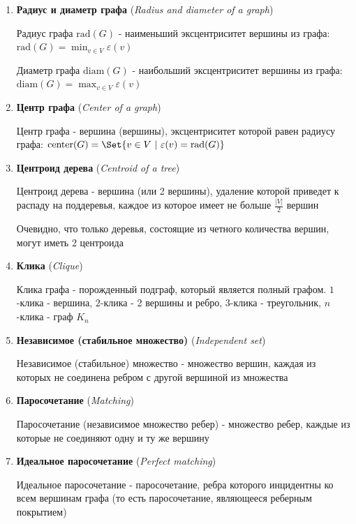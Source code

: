 \documentclass[12pt]{article}
\begin{document}
\begin{enumerate}
        \item \textbf{Радиус и диаметр графа} (\textit{Radius and diameter of a graph})

        Радиус графа $\text{rad}(G)$ - наименьший эксцентриситет вершины из графа: $\text{rad}(G) = \min_{v \in V} \varepsilon(v)$

        Диаметр графа $\text{diam}(G)$ - наибольший эксцентриситет вершины из графа: $\text{diam}(G) = \max_{v \in V} \varepsilon(v)$

        \item \textbf{Центр графа} (\textit{Center of a graph})

        Центр графа - вершина (вершины), эксцентриситет которой равен радиусу графа: $\text{center}(G) = \Set{v \in V \ | \ \varepsilon(v) = \text{rad}(G)}$

        \item \textbf{Центроид дерева} (\textit{Centroid of a tree})

        Центроид дерева - вершина (или 2 вершины), удаление которой приведет к распаду на поддеревья, каждое из которое имеет не больше $\frac{|V|}{2}$ вершин

        Очевидно, что только деревья, состоящие из четного количества вершин, могут иметь 2 центроида


        \item \textbf{Клика} (\textit{Clique})

        Клика графа - порожденный подграф, который является полный графом. $1$-клика - вершина, $2$-клика - 2 вершины и ребро, $3$-клика - треугольник, $n$-клика - граф $K_n$

        \item \textbf{Независимое (стабильное множество)} (\textit{Independent set})

        Независимое (стабильное) множество - множество вершин, каждая из которых не соединена ребром с другой вершиной из множества

        \item \textbf{Паросочетание} (\textit{Matching})

        Паросочетание (независимое множество ребер) - множество ребер, каждые из которые не соединяют одну и ту же вершину

        \item \textbf{Идеальное паросочетание} (\textit{Perfect matching})

        Идеальное паросочетание - паросочетание, ребра которого инцидентны ко всем вершинам графа (то есть паросочетание, являющееся реберным покрытием)


\end{enumerate}
\end{document}
